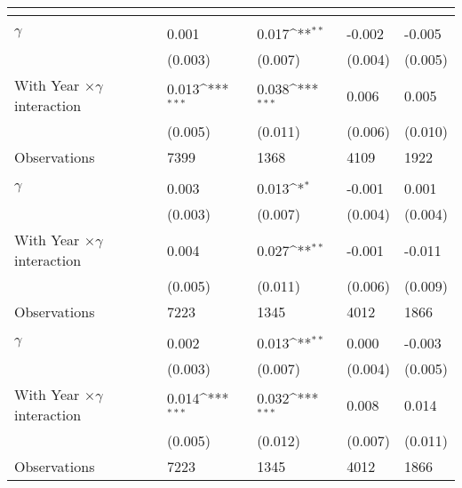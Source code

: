 {
\def\sym#1{\ifmmode^{#1}\else\(^{#1}\)\fi}
\begin{tabularx}{0.85\linewidth}{l *{4}{Y}}
\toprule
                 & &  &  &  \\
\midrule
\addlinespace
{} \\
\addlinespace
$\gamma$    &    0.001   &    0.017\sym{**} &   -0.002   &   -0.005  \\
            &  (0.003)  &  (0.007)   &  (0.004)  &  (0.005)  \\
\addlinespace
With Year $\times\gamma$ interaction & 0.013\sym{***}  &  0.038\sym{***} & 0.006 &  0.005 \\
		 &  (0.005) &  (0.011)  &  (0.006)  &  (0.010) \\
       
\midrule
Observations    &     7399         &     1368 &     4109 &    1922         \\

\midrule
\addlinespace
{} \\
\addlinespace
$\gamma$        &    0.003     &    0.013\sym{*} &   -0.001  &    0.001  \\
                &  (0.003)  &  (0.007)       &  (0.004)          &  (0.004)      \\
\addlinespace
With Year $\times\gamma$ interaction &  0.004  &  0.027\sym{**} &   -0.001   &   -0.011   \\
    &  (0.005)         &  (0.011)           &  (0.006)          &  (0.009)        \\ 
\midrule
Observations    &    7223       &     1345   &     4012 &     1866         \\

\midrule
\addlinespace
{} \\
\addlinespace
$\gamma$        &    0.002  &  0.013\sym{**}&    0.000     &   -0.003      \\
                &  (0.003)  &  (0.007)    &  (0.004)     &  (0.005)         \\
\addlinespace
 With Year $\times\gamma$ interaction & 0.014\sym{***}  & 0.032\sym{***}  &    0.008   & 0.014   \\
         &  (0.005)         &  (0.012)     &  (0.007)  &  (0.011)    \\
\midrule
Observations    &     7223    &     1345   &     4012     &     1866         \\


\end{tabularx}}
